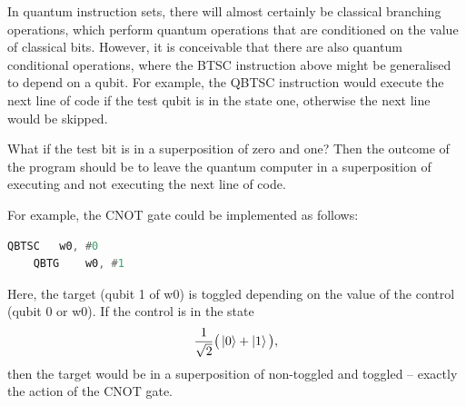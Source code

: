 In quantum instruction sets, there will almost certainly be classical branching operations, which perform quantum operations that are conditioned on the value of classical bits. However, it is conceivable that there are also quantum conditional operations, where the BTSC instruction above might be generalised to depend on a qubit. For example, the QBTSC instruction would execute the next line of code if the test qubit is in the state one, otherwise the next line would be skipped.

What if the test bit is in a superposition of zero and one? Then the outcome of the program should be to leave the quantum computer in a superposition of executing and not executing the next line of code.

For example, the CNOT gate could be implemented as follows:
\begin{lstlisting}[language=asm]
    QBTSC   w0, #0
    QBTG    w0, #1
\end{lstlisting}
Here, the target (qubit 1 of w0) is toggled depending on the value of the control (qubit 0 or w0). If the control is in the state $$\frac{1}{\sqrt{2}}\big(\left\vert{0}\right\rangle+\left\vert{1}\right\rangle\big),$$ then the target would be in a superposition of non-toggled and toggled -- exactly the action of the CNOT gate. 

